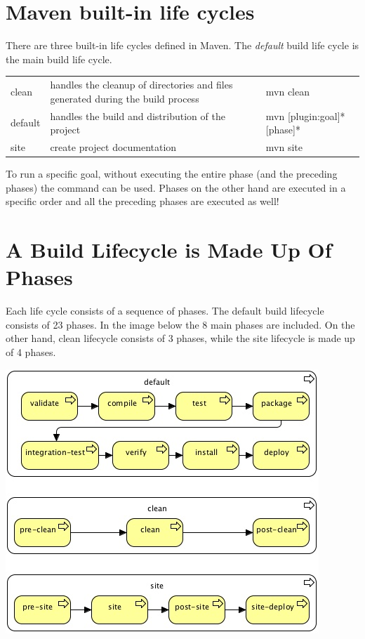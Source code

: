\section{Maven built-in life cycles}

There are three built-in life cycles defined in Maven.  The \textit{default} build life cycle is the main build life cycle.

\begin{tabularx}{\textwidth}{ |l|X|l| } 
\hline
clean & handles the cleanup of directories and files generated during the build process & mvn clean \\ 
default & handles the build and distribution of the project & mvn [plugin:goal]* [phase]* \\ 
site & create project documentation & mvn site \\ 
\hline
\end{tabularx}

To run a specific goal, without executing the entire phase (and the preceding phases) the command  can be used.  Phases on the other hand are executed in a specific order and all the preceding phases are executed as well!

\section{A Build Lifecycle is Made Up Of Phases}

Each life cycle consists of a sequence of phases. The default build lifecycle consists of 23 phases. In the image below the 8 main phases are included. On the other hand, clean lifecycle consists of 3 phases, while the site lifecycle is made up of 4 phases.

\includegraphics[width=\textwidth]{./images/maven/maven-lifecycles} 

